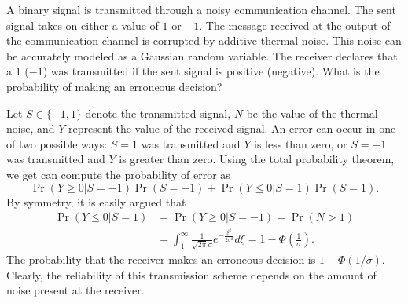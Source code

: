\begin{example} \label{example:NoiseCommunicationSystem1}
A binary signal is transmitted through a noisy communication channel.
The sent signal takes on either a value of $1$ or $-1$.
The message received at the output of the communication channel is corrupted by additive thermal noise.
This noise can be accurately modeled as a Gaussian random variable.
The receiver declares that a $1$ ($-1$) was transmitted if the sent signal is positive (negative).
What is the probability of making an erroneous decision?

Let $S \in \{ -1, 1 \}$ denote the transmitted signal, $N$ be the value of the thermal noise, and $Y$ represent the value of the received signal.
An error can occur in one of two possible ways: $S = 1$ was transmitted and $Y$ is less than zero, or $S = -1$ was transmitted and $Y$ is greater than zero.
Using the total probability theorem, we get can compute the probability of error as
\begin{equation*}
\Pr (Y \geq 0 | S = -1) \Pr (S = -1)
+ \Pr (Y \leq 0 | S = 1) \Pr (S = 1).
\end{equation*}
By symmetry, it is easily argued that
\begin{equation*}
\begin{split}
\Pr (Y \leq 0 | S = 1) &= \Pr (Y \geq 0 | S = -1) = \Pr (N > 1) \\
&= \int_{1}^{\infty} \frac{1}{\sqrt{2 \pi} \sigma}
e^{- \frac{\xi^2}{2 \sigma^2}} d\xi
= 1 - \Phi \left( \frac{1}{\sigma} \right) .
\end{split}
\end{equation*}
The probability that the receiver makes an erroneous decision is $1 - \Phi (1/\sigma)$.
Clearly, the reliability of this transmission scheme depends on the amount of noise present at the receiver.
\end{example}

